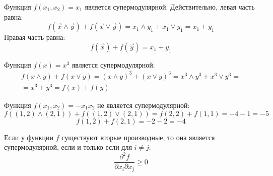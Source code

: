 \begin{myex} Функция $ f(x_{1},x_{2})=x_{1} $ является супермодулярной. Действительно, левая часть равна:
\begin{equation}
f(\vec{x}\wedge\vec{y})+f(\vec{x}\vee\vec{y})=x_{1}\wedge y_{1}+x_{1}\vee y_{1}=x_{1}+y_{1}
\end{equation}
Правая часть равна:
\begin{equation}
f(\vec{x})+f(\vec{y})=x_{1}+y_{1}
\end{equation}
\end{myex}

\begin{myex} Функция $ f(x)=x^{3} $ является супермодулярной:
\begin{multline}
f(x\wedge y)+f(x \vee y)=(x\wedge y)^{3}+(x\vee y)^{3}=x^{3}\wedge y^{3} + x^{3}\vee y^{3}=\\
=x^{3}+y^{3}=f(x)+f(y)
\end{multline}
\end{myex}

\begin{myex} Функция $ f(x_{1},x_{2})=-x_{1}x_{2} $ не является супермодулярной:
\begin{equation}
f((1,2)\wedge (2,1))+f((1,2)\vee (2,1))=f(2,2)+f(1,1)=-4-1=-5
\end{equation}
\begin{equation}
f(1,2)+f(2,1)=-2-2=-4
\end{equation}


\end{myex}




\begin{myth} Если у функции $ f $ существуют вторые производные, то она является супермодулярной, если и только если для $ i\neq j $:
\label{supermod_crit}
\begin{equation}
\frac{\partial^{2}f}{\partial x_{i}\partial x_{j}}\geq 0
\end{equation}
\end{myth}


